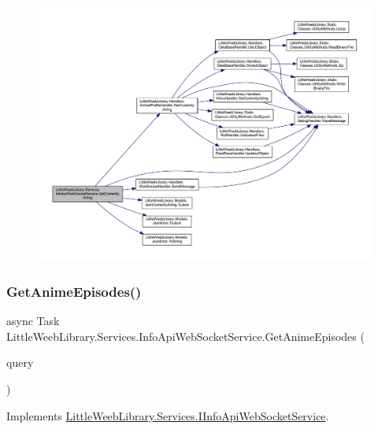 \begin{figure}[H]
\begin{center}
\leavevmode
\includegraphics[width=350pt]{class_little_weeb_library_1_1_services_1_1_info_api_web_socket_service_a71d24528e1dd2c138abed9778e9cc761_cgraph}
\end{center}
\end{figure}
\mbox{\label{class_little_weeb_library_1_1_services_1_1_info_api_web_socket_service_a754f738fba586cc927d64251329c736a}} 
\subsubsection{\texorpdfstring{Get\+Anime\+Episodes()}{GetAnimeEpisodes()}}
{\footnotesize\ttfamily async Task Little\+Weeb\+Library.\+Services.\+Info\+Api\+Web\+Socket\+Service.\+Get\+Anime\+Episodes (\begin{DoxyParamCaption}\item[{J\+Object}]{query }\end{DoxyParamCaption})}



Implements \mbox{\hyperlink{interface_little_weeb_library_1_1_services_1_1_i_info_api_web_socket_service_aa6af79ecbc2f3f3747416adfa54f1c4a}{Little\+Weeb\+Library.\+Services.\+I\+Info\+Api\+Web\+Socket\+Service}}.



